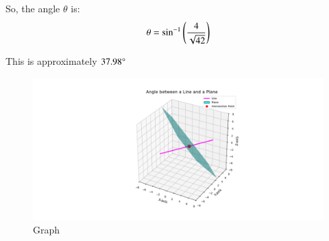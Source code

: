 \documentclass[journal]{IEEEtran}
\begin{document}
So, the angle $\theta$ is:
\begin{align}
\theta = \sin^{-1}\left(\frac{4}{\sqrt{42}}\right)
\end{align}


This is approximately $37.98\degree$

\begin{figure}[h]
    \centering
    \includegraphics[width=\columnwidth]{figs/pure_python.png}
    \caption{Graph}
    \label{fig:fig}
 \end{figure}
\end{document}
